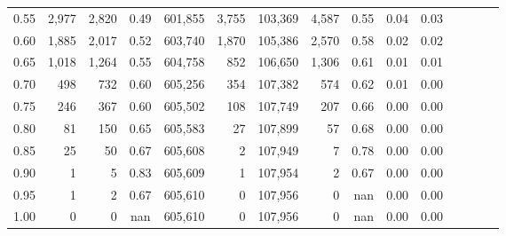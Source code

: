 \begin{tabular}{rrrcrrrrrrrrrrr}
0.55 &    2,977 &   2,820 &                                       0.49 &  601,855 &    3,755 &  103,369 &    4,587 &  0.55 &  0.04 &                         0.03 \\
0.60 &    1,885 &   2,017 &                                       0.52 &  603,740 &    1,870 &  105,386 &    2,570 &  0.58 &  0.02 &                         0.02 \\
0.65 &    1,018 &   1,264 &                                       0.55 &  604,758 &      852 &  106,650 &    1,306 &  0.61 &  0.01 &                         0.01 \\
0.70 &      498 &     732 &                                       0.60 &  605,256 &      354 &  107,382 &      574 &  0.62 &  0.01 &                         0.00 \\
0.75 &      246 &     367 &                                       0.60 &  605,502 &      108 &  107,749 &      207 &  0.66 &  0.00 &                         0.00 \\
0.80 &       81 &     150 &                                       0.65 &  605,583 &       27 &  107,899 &       57 &  0.68 &  0.00 &                         0.00 \\
0.85 &       25 &      50 &                                       0.67 &  605,608 &        2 &  107,949 &        7 &  0.78 &  0.00 &                         0.00 \\
0.90 &        1 &       5 &                                       0.83 &  605,609 &        1 &  107,954 &        2 &  0.67 &  0.00 &                         0.00 \\
0.95 &        1 &       2 &                                       0.67 &  605,610 &        0 &  107,956 &        0 &   nan &  0.00 &                         0.00 \\
1.00 &        0 &       0 &                                        nan &  605,610 &        0 &  107,956 &        0 &   nan &  0.00 &                         0.00 \\
\bottomrule
\end{tabular}
